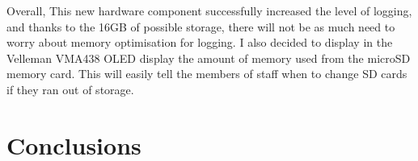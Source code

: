 \documentclass[12pt]{article}
\begin{document}
Overall, This new hardware component successfully increased the level of logging, and thanks to the 16GB of possible storage, there will not be as much need to worry about memory optimisation for logging. I also decided to display in the Velleman VMA438 OLED display the amount of memory used from the microSD memory card. This will easily tell the members of staff when to change SD cards if they ran out of storage. 

\section{Conclusions}

\newpage
\printbibliography
\end{document}
